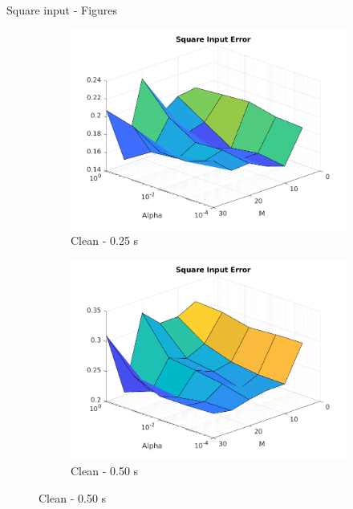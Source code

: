\documentclass{beamer}
\begin{document}
\begin{frame}{Square input - Figures}
    \begin{figure}
        \centering
        \begin{subfigure}[b]{0.3\textwidth}
            \centering
            \includegraphics[width=\textwidth]{Figures_Clean/figure_square_T_0.25.png}
            \caption{Clean - 0.25 s}
            \label{fig:clean_square_025}
        \end{subfigure}
        \hfill
        \begin{subfigure}[b]{0.3\textwidth}
            \centering
            \includegraphics[width=\textwidth]{Figures_Clean/figure_square_T_0.50.png}
            \caption{Clean - 0.50 s}
            \label{fig:clean_square_050}
        \end{subfigure}

\end{figure}
\end{frame}
\end{document}
